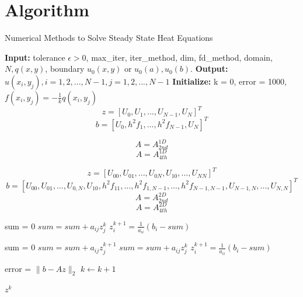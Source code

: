 \documentclass[a4paper]{article}
\begin{document}
\section{Algorithm}
\begin{algorithm}
\caption{Numerical Methods to Solve Steady State Heat Equations}
    \begin{algorithmic}
    \State \textbf{Input:} tolerance $\epsilon >0$, max\_iter, iter\_method, dim, fd\_method, domain, $N, q(x,y)$, boundary $u_0(x,y)$ or $u_0(a), u_0(b)$.
    \State \textbf{Output:} $u(x_i,y_j), i = 1,2,...,N-1, j = 1,2,...,N-1$ 
    \State \textbf{Initialize:} k = 0, error = 1000, $f(x_i,y_j) = -\frac{1}{k}q(x_i,y_j)$
            $$z=[U_0, U_1,...,U_{N-1},U_N]^T$$
            $$b = [ U_0, h^2f_1,...,h^2f_{N-1}, U_N ]^T$$
            
            $$A = A_{2nd}^{1D}$$
            \Else
            $$A = A_{4th}^{1D}$$
            \EndIf
        \EndIf
        
             $$z = [U_{00}, U_{01},...,U_{0N},U_{10},...,U_{NN}]^T$$
             $$b = [U_{00}, U_{01},..., U_{0,N}, U_{10}, h^2f_{11},...,h^2f_{1,N-1},...,h^2f_{N-1,N-1},U_{N-1,N},...,U_{N,N} ]^T $$
            $$A = A_{2nd}^{2D}$$
            \Else
            $$A = A_{4th}^{2D}$$
            \EndIf
        \EndIf
    
        
        
        sum = 0
        $sum = sum+a_{ij}z_j^k$
        \EndIf
        \EndFor
        $z_i^{k+1} = \frac{1}{a_{ii}}(b_i-sum)$
        \EndFor
        \EndIf
        
        
        sum = 0
        $sum = sum+a_{ij}z_j^{k+1}$
        \EndFor
        $sum = sum+a_{ij}z_j^k$
        \EndFor
        $z_i^{k+1} = \frac{1}{a_{ii}}(b_i-sum)$
        \EndFor
        
        \EndIf
         
        \State error = $\|b-Az\|_2$
        \State $k \leftarrow k+1$

        \EndWhile
    \Return $z^k$
    \end{algorithmic}
\end{algorithm}
\end{document}
